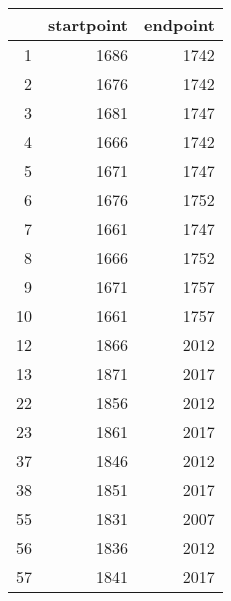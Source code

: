 % 
\begin{tabular}{rrr}
  \hline
 & startpoint & endpoint \\ 
  \hline
1 & 1686 & 1742 \\ 
  2 & 1676 & 1742 \\ 
  3 & 1681 & 1747 \\ 
  4 & 1666 & 1742 \\ 
  5 & 1671 & 1747 \\ 
  6 & 1676 & 1752 \\ 
  7 & 1661 & 1747 \\ 
  8 & 1666 & 1752 \\ 
  9 & 1671 & 1757 \\ 
  10 & 1661 & 1757 \\ 
  12 & 1866 & 2012 \\ 
  13 & 1871 & 2017 \\ 
  22 & 1856 & 2012 \\ 
  23 & 1861 & 2017 \\ 
  37 & 1846 & 2012 \\ 
  38 & 1851 & 2017 \\ 
  55 & 1831 & 2007 \\ 
  56 & 1836 & 2012 \\ 
  57 & 1841 & 2017 \\ 
   \hline
\end{tabular}
